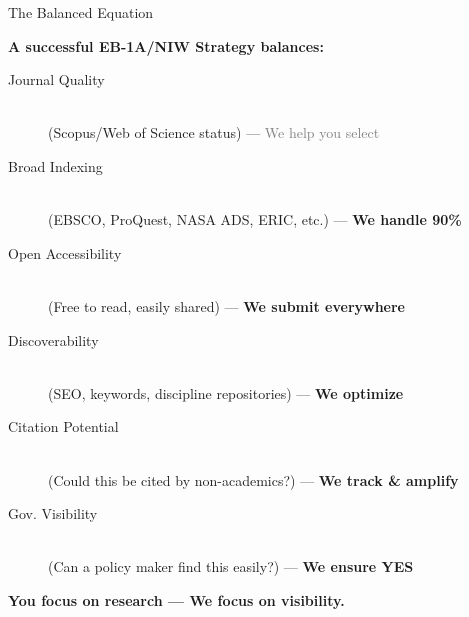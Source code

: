 \documentclass[10pt, aspectratio=169]{beamer}
\begin{document}
	\begin{frame}{The Balanced Equation}
		\begin{center}
			\Large{\textbf{A successful EB-1A/NIW Strategy balances:}}
		\end{center}
		\vspace{0.5cm}
		\begin{description}
			\item[Journal Quality] \hfill \\ (Scopus/Web of Science status) — \textcolor{gray}{We help you select}
			\item[Broad Indexing] \hfill \\ (EBSCO, ProQuest, NASA ADS, ERIC, etc.) — \textcolor{myblue}{\textbf{We handle 90\%}}
			\item[Open Accessibility] \hfill \\ (Free to read, easily shared) — \textcolor{myblue}{\textbf{We submit everywhere}}
			\item[Discoverability] \hfill \\ (SEO, keywords, discipline repositories) — \textcolor{myblue}{\textbf{We optimize}}
			\item[Citation Potential] \hfill \\ (Could this be cited by non-academics?) — \textcolor{myblue}{\textbf{We track \& amplify}}
			\item[Gov. Visibility] \hfill \\ (Can a policy maker find this easily?) — \textcolor{myblue}{\textbf{We ensure YES}}
		\end{description}
		\vspace{0.3cm}
		\begin{center}
			\textcolor{myorange}{\textbf{You focus on research — We focus on visibility.}}
		\end{center}
	\end{frame}
	
\end{document}
